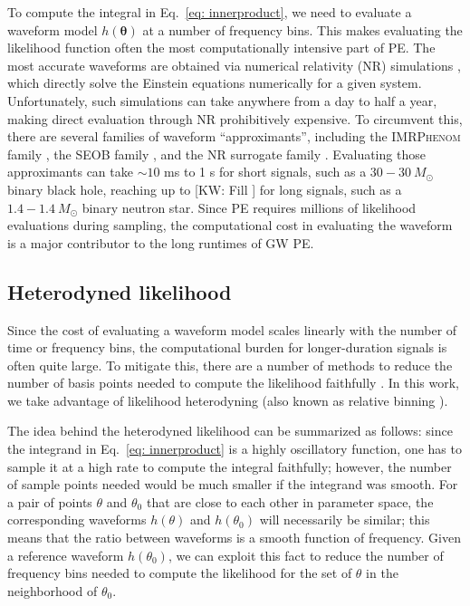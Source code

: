\documentclass[twocolumn]{aastex631}
\newcommand{\kw}[1]{{\color{rb4}[KW: #1 ]}}
\begin{document}
To compute the integral in Eq.~\eqref{eq: innerproduct}, we need to evaluate a
waveform model $h(\mathbf{\theta})$ at a number of frequency bins. This makes
evaluating the likelihood function often the most computationally intensive
part of PE. The most accurate waveforms are obtained via numerical relativity
(NR) simulations \citep{BaumgarteShaprio:NumRel}, which directly solve the Einstein equations numerically for a
given system. Unfortunately, such simulations can take anywhere from a day to
half a year, making direct evaluation through NR prohibitively expensive. To
circumvent this, there are several families of waveform ``approximants'',
including the \textsc{IMRPhenom} family \citep{Khan:2015jqa,
Garcia-Quiros:2020qpx}, the \textsc{SEOB} family \citep{PhysRevD.89.061502}, and
the NR surrogate family \citep{Varma:2019csw}. Evaluating those approximants can
take ${\sim}10$ ms to 1 s for short signals, such as a $30-30\ M_{\odot}$
binary black hole, reaching up to \kw{Fill} for long signals, such as a
$1.4-1.4\ M_{\odot}$ binary neutron star.  Since PE requires millions of
likelihood evaluations during sampling, the computational cost in evaluating
the waveform is a major contributor to the long runtimes of GW PE.

\subsection{Heterodyned likelihood}

Since the cost of evaluating a waveform model scales linearly with the number
of time or frequency bins, the computational burden for longer-duration signals
is often quite large. To mitigate this, there are a number of methods to reduce
the number of basis points needed to compute the likelihood faithfully
\citep{Field:2011mf, Field:2013cfa, Smith:2016qas,
Vinciguerra:2017ngf,Morisaki:2020oqk,Morisaki:2021ngj}. In this work, we take
advantage of likelihood heterodyning \citep{Cornish:2010kf,Cornish:2021lje}
(also known as relative binning \citep{Zackay:2018qdy}).

The idea behind the heterodyned likelihood can be summarized as follows: since
the integrand in Eq.~\eqref{eq: innerproduct} is a highly oscillatory function,
one has to sample it at a high rate to compute the integral faithfully;
however, the number of sample points needed would be much smaller if the
integrand was smooth. For a pair of points $\theta$ and $\theta_0$ that are
close to each other in parameter space, the corresponding waveforms $h(\theta)$
and $h(\theta_0)$ will necessarily be similar; this means that the ratio
between waveforms is a smooth function of frequency. Given a reference
waveform $h(\theta_0)$, we can exploit this fact to reduce the number of
frequency bins needed to compute the likelihood for the set of $\theta$ in the
neighborhood of $\theta_0$.
\end{document}
